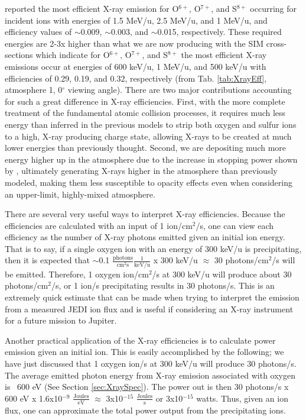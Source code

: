 \documentclass[draft]{agujournal2018}
\begin{document}
\citet{ozak2010} reported the most efficient X-ray emission for O$^{6+}$, O$^{7+}$, and S$^{8+}$ occurring for incident ions with energies of 1.5 MeV/u, 2.5 MeV/u, and 1 MeV/u, and efficiency values of $\sim$0.009, $\sim$0.003, and $\sim$0.015, respectively.
These required energies are 2-3x higher than what we are now producing with the SIM cross-sections which indicate for O$^{6+}$, O$^{7+}$, and S$^{8+}$ the most efficient X-ray emissions occur at energies of 600 keV/u, 1 MeV/u, and 500 keV/u with efficiencies of 0.29, 0.19, and 0.32, respectively (from Tab. \ref{tab:XrayEff}, atmosphere 1, 0$^{\circ}$ viewing angle).
There are two major contributions accounting for such a great difference in X-ray efficiencies.
First, with the more complete treatment of the fundamental atomic collision processes, it requires much less energy than inferred in the previous models to strip both oxygen and sulfur ions to a high, X-ray producing charge state, allowing X-rays to be created at much lower energies than previously thought.
Second, we are depositing much more energy higher up in the atmosphere due to the increase in stopping power shown by \citet{schultz2019}, ultimately generating X-rays higher in the atmosphere than previously modeled, making them less susceptible to opacity effects even when considering an upper-limit, highly-mixed atmosphere.

There are several very useful ways to interpret X-ray efficiencies.
Because the efficiencies are calculated with an input of 1 ion/cm$^2$/s, one can view each efficiency as the number of X-ray photons emitted given an initial ion energy.
That is to say, if a single oxygen ion with an energy of 300 keV/u is precipitating, then it is expected that $\sim$0.1 $\frac{\mathrm{photons}}{\mathrm{cm}^2 \mathrm{s}}\frac{1}{\mathrm{keV/u}}$ x 300 keV/u $\approx$ 30 photons/cm$^2$/s will be emitted.
Therefore, 1 oxygen ion/cm$^2$/s at 300 keV/u will produce about 30 photons/cm$^2$/s, or 1 ion/s precipitating results in 30 photons/s.
This is an extremely quick estimate that can be made when trying to interpret the emission from a measured JEDI ion flux and is useful if considering an X-ray instrument for a future mission to Jupiter.

Another practical application of the X-ray efficiencies is to calculate power emission given an initial ion.
This is easily accomplished by the following; we have just discussed that 1 oxygen ion/s at 300 keV/u will produce 30 photons/s.
The average emitted photon energy from X-ray emission associated with oxygen is ~600 eV (See Section \ref{sec:XraySpec}).
The power out is then 30 photons/s x 600 eV x 1.6x10$^{-9}$ $\frac{\mathrm{Joules}}{\mathrm{eV}}$ $\approx$ 3x10$^{-15}$ $\frac{\mathrm{Joules}}{\mathrm{s}}$ or 3x10$^{-15}$ watts.
Thus, given an ion flux, one can approximate the total power output from the precipitating ions.
\end{document}
